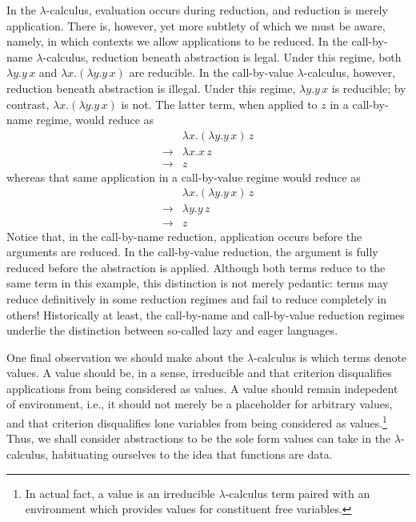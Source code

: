 \documentclass[ms,electronic,twosidetoc,letterpaper,chaptercenter,parttop]{byumsphd}
\begin{document}
In the $\lambda$-calculus, evaluation occurs during reduction, and reduction is merely
application. There is, however, yet more subtlety of which we must be aware, namely, in
which contexts we allow applications to be reduced. In the call-by-name
$\lambda$-calculus, reduction beneath abstraction is legal. Under this regime, both
$\lambda y.y\,x$ and $\lambda x.(\lambda y.y\,x)$ are reducible. In the call-by-value
$\lambda$-calculus, however, reduction beneath abstraction is illegal. Under this regime,
$\lambda y.y\,x$ is reducible; by contrast, $\lambda x.(\lambda y.y\,x)$ is not.  The
latter term, when applied to $z$ in a call-by-name regime, would reduce as
\begin{align*}
            &\lambda x.(\lambda y.y\, x)\,z\\
\rightarrow &\lambda x.x\,z\\
\rightarrow &z
\end{align*}
whereas that same application in a call-by-value regime would reduce as
\begin{align*}
            &\lambda x.(\lambda y.y\, x)\,z\\
\rightarrow &\lambda y.y\,z\\
\rightarrow &z
\end{align*}
Notice that, in the call-by-name reduction, application occurs before the arguments are
reduced. In the call-by-value reduction, the argument is fully reduced before the
abstraction is applied. Although both terms reduce to the same term in this example, this
distinction is not merely pedantic: terms may reduce definitively in some reduction
regimes and fail to reduce completely in others! Historically at least, the call-by-name
and call-by-value reduction regimes underlie the distinction between so-called lazy and
eager languages.

One final observation we should make about the $\lambda$-calculus is which terms denote
values. A value should be, in a sense, irreducible and that criterion disqualifies
applications from being considered as values. A value should remain indepedent of
environment, i.e., it should not merely be a placeholder for arbitrary values, and that
criterion disqualifies lone variables from being considered as values.\footnote{In actual
fact, a value is an irreducible $\lambda$-calculus term paired with an environment which
provides values for constituent free variables.} Thus, we shall consider abstractions to
be the sole form values can take in the $\lambda$-calculus, habituating ourselves to the
idea that functions are data.
\end{document}
